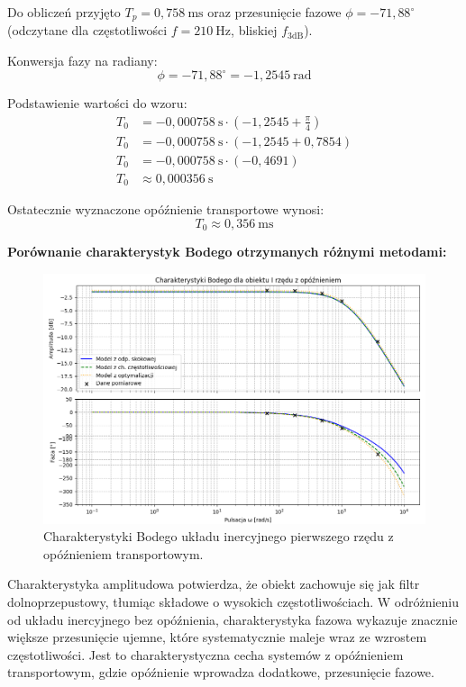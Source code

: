 \documentclass[12pt,a4paper]{article}
\begin{document}
	Do obliczeń przyjęto $T_p = 0{,}758~\text{ms}$ oraz przesunięcie fazowe $\phi = -71{,}88^{\circ}$ (odczytane dla częstotliwości $f = 210~\text{Hz}$, bliskiej $f_{3\text{dB}}$).
	
	Konwersja fazy na radiany:
	\[
	\phi = -71{,}88^{\circ} = -1{,}2545~\text{rad}
	\]
	
	Podstawienie wartości do wzoru:
	\begin{align*}
		T_0 &= -0{,}000758~\text{s} \cdot \left( -1{,}2545 + \frac{\pi}{4} \right) \\
		T_0 &= -0{,}000758~\text{s} \cdot \left( -1{,}2545 + 0{,}7854 \right) \\
		T_0 &= -0{,}000758~\text{s} \cdot (-0{,}4691) \\
		T_0 &\approx 0{,}000356~\text{s}
	\end{align*}
	
	Ostatecznie wyznaczone opóźnienie transportowe wynosi:
	\[
	\boxed{T_0 \approx 0{,}356~\text{ms}}
	\]
	
	\textbf{Porównanie charakterystyk Bodego otrzymanych różnymi metodami:}
	\begin{figure}[H]
		\centering
		\includegraphics[width=1\linewidth]{zdjecia/1rzad_z_opz.png}
		\caption{Charakterystyki Bodego układu inercyjnego pierwszego rzędu z opóźnieniem transportowym.}
		\label{fig:Body1_z_opz}
	\end{figure}
	
	Charakterystyka amplitudowa potwierdza, że obiekt zachowuje się jak filtr dolnoprzepustowy, tłumiąc składowe o wysokich częstotliwościach. W odróżnieniu od układu inercyjnego bez opóźnienia, charakterystyka fazowa wykazuje znacznie większe przesunięcie ujemne, które systematycznie maleje wraz ze wzrostem częstotliwości. Jest to charakterystyczna cecha systemów z opóźnieniem transportowym, gdzie opóźnienie wprowadza dodatkowe, przesunięcie fazowe.
	
\end{document}
